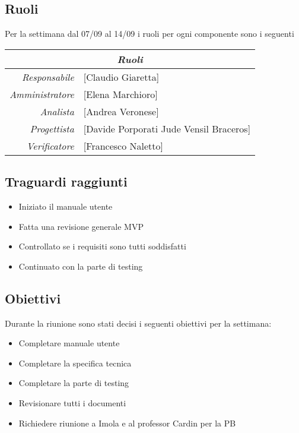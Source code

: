 \documentclass[12pt]{article}
\begin{document}
\subsection{Ruoli}
Per la settimana dal 07/09 al 14/09 i ruoli per ogni componente sono i seguenti
\\
\begin{tabular}{r | l}
    \multicolumn{2}{c}{\textit{Ruoli}}\\
    \hline
    \textit{Responsabile} &
    [Claudio Giaretta]\makecell{}\\
    \textit{Amministratore} &
    [Elena Marchioro]\makecell{}\\
    \textit{Analista} &
    [Andrea Veronese]\makecell{}\\
    \textit{Progettista} &
    [Davide Porporati Jude Vensil Braceros]\makecell{}\\
    \textit{Verificatore} & 
    [Francesco Naletto]\makecell{}\\
\end{tabular}

\subsection{Traguardi raggiunti}
\begin{itemize}
    \item Iniziato il manuale utente
    \item Fatta una revisione generale MVP
    \item Controllato se i requisiti sono tutti soddisfatti
    \item Continuato con la parte di testing
\end{itemize}

\subsection{Obiettivi}
Durante la riunione sono stati decisi i seguenti obiettivi per la settimana:
\begin{itemize}
    \item Completare manuale utente
    \item Completare la specifica tecnica
    \item Completare la parte di testing
    \item Revisionare tutti i documenti
    \item Richiedere riunione a Imola e al professor Cardin per la PB
\end{itemize}
\end{document}
